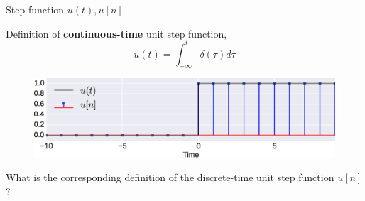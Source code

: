 \documentclass{beamer}
\begin{document}
\begin{frame}{Step function $u(t), u[n]$}

Definition of \textbf{continuous-time} unit step function,
\[ u(t) = \int_{-\infty}^{t} \delta(\tau)d\tau \]

\begin{figure}
\includegraphics[width=\textwidth]{img/step.eps}
\end{figure}

What is the corresponding definition of the discrete-time unit step function $u[n]$?
\end{frame}
\end{document}
